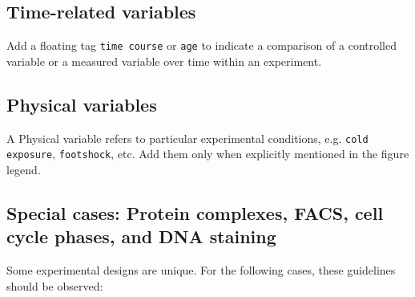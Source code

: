 \documentclass{bioinfo}
\begin{document}
\subsection{Time-related variables}\label{app:time-related-variables}
Add a floating tag \texttt{time course} or \texttt{age} to indicate a comparison of a controlled variable or a measured variable over time within an experiment.

\subsection{Physical variables}\label{app:physical-variables}
A Physical variable refers to particular experimental conditions, e.g. \texttt{cold exposure}, \texttt{footshock}, etc. Add them only when explicitly mentioned in the figure legend.

\subsection{Special cases: Protein complexes, FACS, cell cycle phases, and DNA staining}\label{sec:special-cases}
Some experimental designs are unique. For the following cases, these guidelines should be observed:
\end{document}
